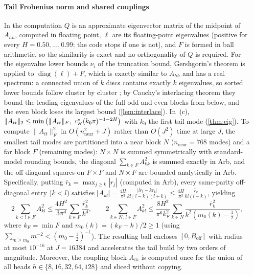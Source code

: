 \paragraph{Tail Frobenius norm and shared couplings} In the computation $Q$ is an approximate eigenvector matrix of the
midpoint of $A_{hh}$, computed in floating point, $\ell$ are its floating-point eigenvalues (positive for every
$H=0.50,\dots,0.99$; the code stops if one is not), and $F$ is formed in ball arithmetic, so the similarity is exact and
no orthogonality of $Q$ is required. For the eigenvalue lower bounds $\nu_i$ of the truncation bound, Gershgorin's
theorem is applied to $\operatorname{diag}(\ell)+F$, which is exactly similar to $A_{hh}$ and has a real spectrum: a
connected union of $k$ discs contains exactly $k$ eigenvalues, so sorted lower bounds follow cluster by cluster
\citep[Theorem~6.1.1]{HJ13}; by Cauchy's interlacing theorem they bound the leading eigenvalues of the full odd and even
blocks from below, and the even block loses its largest bound (\cref{lem:interlace}). In~(c),
$\|A_{tt}\|_2\le\min\big(\|A_{tt}\|_F,\ \cH(k_0\pi)^{-1-2H}\big)$ with $k_0$ the first tail mode (\cref{thm:eig}). To
compute $\|A_{tt}\|_F^2$ in $O(n_{\mathrm{near}}^2+J)$ rather than $O(J^2)$ time at large $J$, the smallest tail
modes are partitioned into a near block $N$ ($n_{\mathrm{near}}=768$ modes) and a far block $F$ (remaining modes):
$N\times N$ is summed symmetrically with standard-model rounding bounds, the diagonal $\sum_{k\in F}A_{kk}^2$ is summed
exactly in Arb, and the off-diagonal squares on $F\times F$ and $N\times F$ are bounded analytically in Arb. Specifically,
putting $\bar r_k=\max_{j\ge k}|r_j|$ (computed in Arb), every same-parity off-diagonal entry ($k<l$) satisfies
$|A_{kl}|=\frac{4H}{\pi^3}\frac{|lr_l-kr_k|}{kl(l-k)(l+k)}\le\frac{4H}{\pi^3}\frac{\bar r_k}{kl(l-k)}$, yielding
\[2\sum_{k<l\in F}A_{kl}^2\le\frac{4H^2}{3\pi^4}\sum_{k\in F}\frac{\bar r_k^2}{k^4},\qquad
2\sum_{k\in N,\,l\in F}A_{kl}^2\le\frac{8H^2}{\pi^6k_F^2}\sum_{k\in N}\frac{\bar r_k^2}{k^2(m_0(k)-\frac12)},\]
where $k_F=\min F$ and $m_0(k)=(k_F-k)/2\ge1$ (using $\sum_{m\ge m_0}m^{-2}<(m_0-\frac12)^{-1}$). The resulting ball
encloses $[0,B_{\mathrm{off}}]$ with radius at most $10^{-16}$ at $J=16384$ and accelerates the tail build by two orders of
magnitude. Moreover, the coupling block $A_{th}$ is computed once for the union of all heads
$h\in\{8,16,32,64,128\}$ and sliced without copying.

